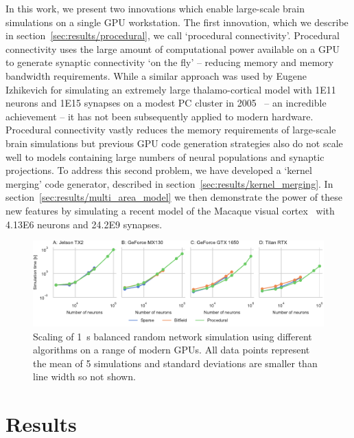 \documentclass[9pt,a4paper]{amsart}
\newenvironment{fullwidth}{%
  \begin{adjustwidth}{-0.85in}{-0.85in}
}{\end{adjustwidth}}
\begin{document}
In this work, we present two innovations which enable large-scale brain simulations on a single GPU workstation.
The first innovation, which we describe in section~\ref{sec:results/procedural}, we call `procedural connectivity'.
Procedural connectivity uses the large amount of computational power available on a GPU to generate synaptic connectivity `on the fly' -- reducing memory and memory bandwidth requirements.
While a similar approach was used by Eugene Izhikevich for simulating an extremely large thalamo-cortical model with \num{1E11} neurons and \num{1E15} synapses on a modest PC cluster in 2005~\citep{Izhikevich2005} -- an incredible achievement -- it has not been subsequently applied to modern hardware.
Procedural connectivity vastly reduces the memory requirements of large-scale brain simulations but previous GPU code generation strategies also do not scale well to models containing large numbers of neural populations and synaptic projections.
To address this second problem, we have developed a `kernel merging' code generator, described in section~\ref{sec:results/kernel_merging}.
In section~\ref{sec:results/multi_area_model} we then demonstrate the power of these new features by simulating a recent model of the Macaque visual cortex~\citep{Schmidt2018} with \num{4.13E6} neurons and \num{24.2E9} synapses.
\vfill
\begin{figure}
    \begin{fullwidth}
        \centering
        \includegraphics{figures/performance_scaling}
        \captionsetup{width=6.69in}
        \caption{Scaling of \SI{1}{\second} balanced random network simulation using different algorithms on a range of modern GPUs. 
        All data points represent the mean of 5 simulations and standard deviations are smaller than line width so not shown.}
        \label{fig:performance_scaling}
    \end{fullwidth}
\end{figure}

\section{Results}
\end{document}
